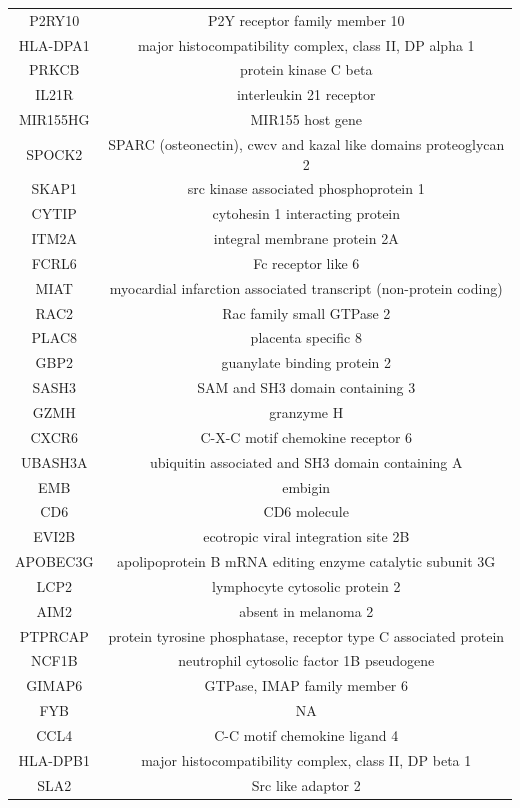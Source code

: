 \documentclass[12pt,]{book}
\theoremstyle{definition}
\theoremstyle{definition}
\theoremstyle{definition}
\theoremstyle{remark}
\begin{document}
\begin{longtable}[t]{cc}
P2RY10 & P2Y receptor family member 10\\
\addlinespace
HLA-DPA1 & major histocompatibility complex, class II, DP alpha 1\\
PRKCB & protein kinase C beta\\
IL21R & interleukin 21 receptor\\
MIR155HG & MIR155 host gene\\
SPOCK2 & SPARC (osteonectin), cwcv and kazal like domains proteoglycan 2\\
\addlinespace
SKAP1 & src kinase associated phosphoprotein 1\\
CYTIP & cytohesin 1 interacting protein\\
ITM2A & integral membrane protein 2A\\
FCRL6 & Fc receptor like 6\\
MIAT & myocardial infarction associated transcript (non-protein coding)\\
\addlinespace
RAC2 & Rac family small GTPase 2\\
PLAC8 & placenta specific 8\\
GBP2 & guanylate binding protein 2\\
SASH3 & SAM and SH3 domain containing 3\\
GZMH & granzyme H\\
\addlinespace
CXCR6 & C-X-C motif chemokine receptor 6\\
UBASH3A & ubiquitin associated and SH3 domain containing A\\
EMB & embigin\\
CD6 & CD6 molecule\\
EVI2B & ecotropic viral integration site 2B\\
\addlinespace
APOBEC3G & apolipoprotein B mRNA editing enzyme catalytic subunit 3G\\
LCP2 & lymphocyte cytosolic protein 2\\
AIM2 & absent in melanoma 2\\
PTPRCAP & protein tyrosine phosphatase, receptor type C associated protein\\
NCF1B & neutrophil cytosolic factor 1B pseudogene\\
\addlinespace
GIMAP6 & GTPase, IMAP family member 6\\
FYB & NA\\
CCL4 & C-C motif chemokine ligand 4\\
HLA-DPB1 & major histocompatibility complex, class II, DP beta 1\\
SLA2 & Src like adaptor 2\\

\end{longtable}
\end{document}
